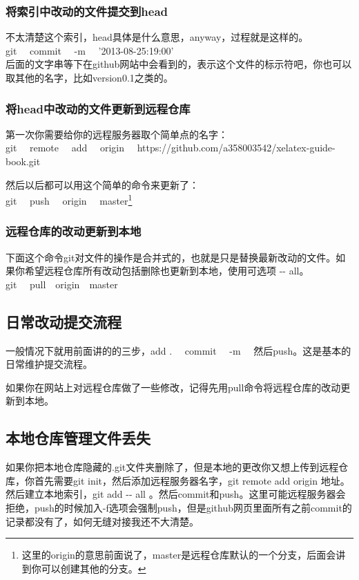 \documentclass[11pt,oneside]{book}
\begin{document}
\begin{common-format}
\subsubsection{将索引中改动的文件提交到head}
不太清楚这个索引，head具体是什么意思，anyway，过程就是这样的。\\
git ~~commit ~~-m ~~'2013-08-25:19:00' \\
后面的文字串等下在github网站中会看到的，表示这个文件的标示符吧，你也可以取其他的名字，比如version0.1之类的。

\subsubsection{将head中改动的文件更新到远程仓库}
第一次你需要给你的远程服务器取个简单点的名字：\\
git ~~remote ~~add ~~origin ~~https://github.com/a358003542/xelatex-guide-book.git

然后以后都可以用这个简单的命令来更新了：\\
git~~ push~~ origin~~ master\footnote{这里的origin的意思前面说了，master是远程仓库默认的一个分支，后面会讲到你可以创建其他的分支。}

\subsubsection{远程仓库的改动更新到本地}
下面这个命令git对文件的操作是合并式的，也就是只是替换最新改动的文件。如果你希望远程仓库所有改动包括删除也更新到本地，使用可选项 -{}- all。\\
git ~~pull~~origin~~master


\subsection{日常改动提交流程}
一般情况下就用前面讲的的三步，add .~~ commit ~~-m~~ 然后push。这是基本的日常维护提交流程。

如果你在网站上对远程仓库做了一些修改，记得先用pull命令将远程仓库的改动更新到本地。

\subsection{本地仓库管理文件丢失}
如果你把本地仓库隐藏的.git文件夹删除了，但是本地的更改你又想上传到远程仓库，你首先需要git init，然后添加远程服务器名字，git remote add origin 地址。然后建立本地索引，git add -{}- all  。然后commit和push。这里可能远程服务器会拒绝，push的时候加入-f选项会强制push，但是github网页里面所有之前commit的记录都没有了，如何无缝对接我还不大清楚。



\end{common-format}
\end{document}
